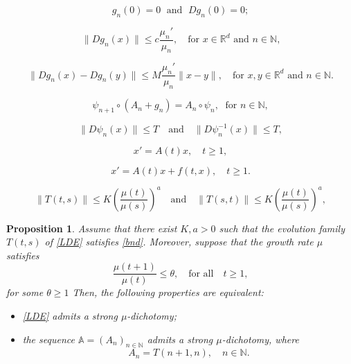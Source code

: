 \documentclass[10pt,a4paper]{amsart}
\newtheorem{proposition}{Proposition}
\def\N{\mathbb{N}}
\def\R{\mathbb{R}}
\begin{document}
\begin{equation}
g_n(0)=0 \;\text{ and } \; Dg_n(0)=0;
\end{equation}

\begin{equation}
\|Dg_n(x)\| \le c\frac{\mu_n'}{\mu_n}, \quad \text{for $x\in \R^d$ and $n\in \N$,}
\end{equation}

\begin{equation}
\|Dg_n(x)-Dg_n(y)\| \le M\frac{\mu_n'}{\mu_n}\|x-y\|, \quad \text{for $x, y\in \R^d$ and $n\in \N$.}
\end{equation}

\begin{equation}
\psi_{n+1}\circ (A_n+g_n)=A_n  \circ \psi_n, \; \text{ for } n\in \N,
\end{equation}

\begin{equation}
\|D\psi_n(x)\| \le T \quad \text{and} \quad \|D\psi_n^{-1}(x)\| \le T,
\end{equation}

\begin{equation}\label{LDE}
x'=A(t)x, \quad t\ge 1,
\end{equation}

\begin{equation}\label{NDE}
x'=A(t)x+f(t,x), \quad t\ge 1.
\end{equation}

\begin{equation}\label{bnd}
\| T(t,s)\| \le K\left(\frac{\mu(t)}{\mu(s)} \right)^a \quad \text{and} \quad \| T(s,t)\| \le K \left(\frac{\mu(t)}{\mu(s)}\right)^a,
\end{equation}

\begin{proposition} \label{prop: equiv pol dich contXdisc}
Assume that there exist $K,a>0$ such that the evolution family $T(t,s)$ of \eqref{LDE} satisfies \eqref{bnd}. Moreover, suppose that the growth rate $\mu$ satisfies
\begin{equation}\label{eq: grbound-cont}
	\frac{\mu(t+1)}{\mu (t)}\le \theta, \quad \text{for all} \quad t\geq 1,
\end{equation} 
for some $\theta\ge 1$
Then, the following properties are equivalent:
\begin{itemize}
\item \eqref{LDE} admits a strong $\mu$-dichotomy;
\item the sequence $\mathbb A =(A_n)_{n\in \N}$ admits a strong $\mu$-dichotomy, where
\begin{equation}\label{AN}
A_n=T(n+1, n), \quad n\in \N.
\end{equation}
\end{itemize}
\end{proposition}
\end{document}
